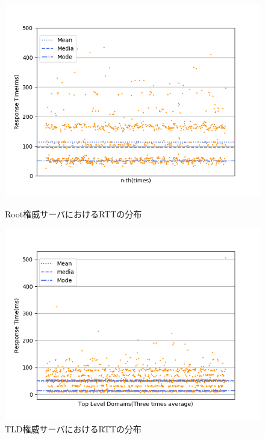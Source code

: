 \begin{figure}[h]
 \centering
 \includegraphics[scale=0.8]{figure/root-rtt.png}
 \vspace{-1cm}
 \caption{Root権威サーバにおけるRTTの分布}
 \label{fig:root-rtt}
 \includegraphics[scale=0.8]{figure/average_rtt.png}
 \vspace{-1cm}
 \caption{TLD権威サーバにおけるRTTの分布}
 \label{fig:tlr-rtt}
\end{figure}



